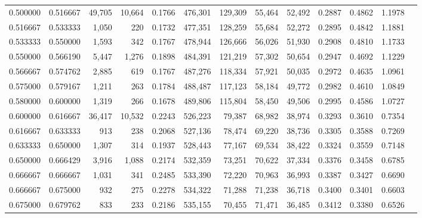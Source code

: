 \begin{tabular}{rrrrrrrrrrrrr}
0.500000 & 0.516667 & 49,705 & 10,664 &                                     0.1766 & 476,301 & 129,309 &  55,464 &  52,492 & 0.2887 & 0.4862 & 1.1978 \\
0.516667 & 0.533333 &  1,050 &    220 &                                     0.1732 & 477,351 & 128,259 &  55,684 &  52,272 & 0.2895 & 0.4842 & 1.1881 \\
0.533333 & 0.550000 &  1,593 &    342 &                                     0.1767 & 478,944 & 126,666 &  56,026 &  51,930 & 0.2908 & 0.4810 & 1.1733 \\
0.550000 & 0.566190 &  5,447 &  1,276 &                                     0.1898 & 484,391 & 121,219 &  57,302 &  50,654 & 0.2947 & 0.4692 & 1.1229 \\
0.566667 & 0.574762 &  2,885 &    619 &                                     0.1767 & 487,276 & 118,334 &  57,921 &  50,035 & 0.2972 & 0.4635 & 1.0961 \\
0.575000 & 0.579167 &  1,211 &    263 &                                     0.1784 & 488,487 & 117,123 &  58,184 &  49,772 & 0.2982 & 0.4610 & 1.0849 \\
0.580000 & 0.600000 &  1,319 &    266 &                                     0.1678 & 489,806 & 115,804 &  58,450 &  49,506 & 0.2995 & 0.4586 & 1.0727 \\
0.600000 & 0.616667 & 36,417 & 10,532 &                                     0.2243 & 526,223 &  79,387 &  68,982 &  38,974 & 0.3293 & 0.3610 & 0.7354 \\
0.616667 & 0.633333 &    913 &    238 &                                     0.2068 & 527,136 &  78,474 &  69,220 &  38,736 & 0.3305 & 0.3588 & 0.7269 \\
0.633333 & 0.650000 &  1,307 &    314 &                                     0.1937 & 528,443 &  77,167 &  69,534 &  38,422 & 0.3324 & 0.3559 & 0.7148 \\
0.650000 & 0.666429 &  3,916 &  1,088 &                                     0.2174 & 532,359 &  73,251 &  70,622 &  37,334 & 0.3376 & 0.3458 & 0.6785 \\
0.666667 & 0.666667 &  1,031 &    341 &                                     0.2485 & 533,390 &  72,220 &  70,963 &  36,993 & 0.3387 & 0.3427 & 0.6690 \\
0.666667 & 0.675000 &    932 &    275 &                                     0.2278 & 534,322 &  71,288 &  71,238 &  36,718 & 0.3400 & 0.3401 & 0.6603 \\
0.675000 & 0.679762 &    833 &    233 &                                     0.2186 & 535,155 &  70,455 &  71,471 &  36,485 & 0.3412 & 0.3380 & 0.6526 \\

\end{tabular}
